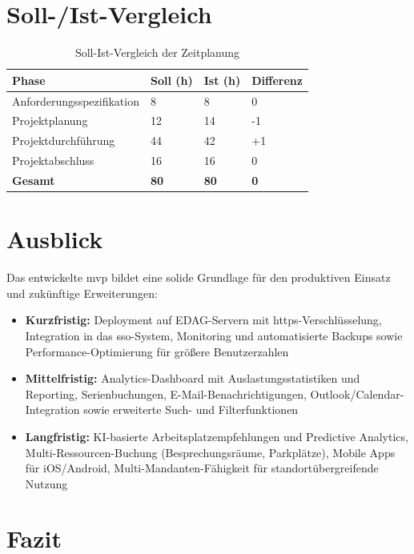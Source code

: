 \documentclass[11pt,a4paper]{report}
\begin{document}
\section{Soll-/Ist-Vergleich}

\begin{table}[h!]
\centering
{}
\begin{tabular}{|p{5cm}|p{2cm}|p{2cm}|p{2cm}|}
\hline
\rowcolor{EDAGgrau}
\textbf{Phase} & \textbf{Soll (h)} & \textbf{Ist (h)} & \textbf{Differenz} \\
\hline
Anforderungsspezifikation & 8 & 8 & 0 \\
Projektplanung & 12 & 14 & -1 \\
Projektdurchführung & 44 & 42 & +1 \\
Projektabschluss & 16 & 16 & 0 \\
\hline
\textbf{Gesamt} & \textbf{80} & \textbf{80} & \textbf{0} \\
\hline
\end{tabular}
\caption{Soll-Ist-Vergleich der Zeitplanung}
\end{table}


\section{Ausblick}

Das entwickelte \gls{mvp} bildet eine solide Grundlage für den produktiven Einsatz und zukünftige Erweiterungen:

\begin{itemize}
    \item \textbf{Kurzfristig:} Deployment auf EDAG-Servern mit \gls{https}-Verschlüsselung, Integration in das \gls{sso}-System, Monitoring und automatisierte Backups sowie Performance-Optimierung für größere Benutzerzahlen

    \item \textbf{Mittelfristig:} Analytics-Dashboard mit Auslastungsstatistiken und Reporting, Serienbuchungen, E-Mail-Benachrichtigungen, Outlook/Calendar-Integration sowie erweiterte Such- und Filterfunktionen

    \item \textbf{Langfristig:} KI-basierte Arbeitsplatzempfehlungen und Predictive Analytics, Multi-Ressourcen-Buchung (Besprechungsräume, Parkplätze), Mobile Apps für iOS/Android, Multi-Mandanten-Fähigkeit für standortübergreifende Nutzung
\end{itemize}

\section{Fazit}
\end{document}
